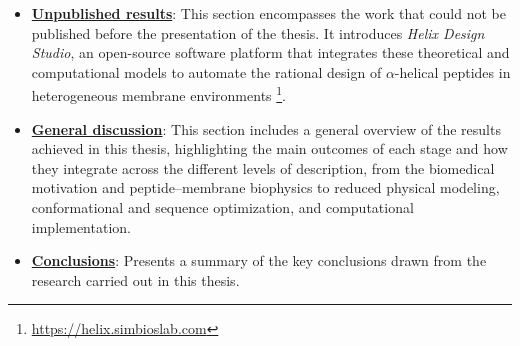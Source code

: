 \begin{itemize}
    \item \textbf{\hyperref[chap:unpublished]{Unpublished results}}: This section encompasses the work that could not be published before the presentation of the thesis. It introduces \textit{Helix Design Studio}, an open-source software platform that integrates these theoretical and computational models to automate the rational design of $\alpha$-helical peptides in heterogeneous membrane environments \footnote{\url{https://helix.simbioslab.com}}. 


    \item \textbf{\hyperref[discussion]{General discussion}}: This section includes a general overview of the results achieved in this thesis, highlighting the main outcomes of each stage and how they integrate across the different levels of description, from the biomedical motivation and peptide–membrane biophysics to reduced physical modeling, conformational and sequence optimization, and computational implementation.


    \item \textbf{\hyperref[conclusions]{Conclusions}}: Presents a summary of the key conclusions drawn from the research carried out in this thesis.
\end{itemize}

\newpage